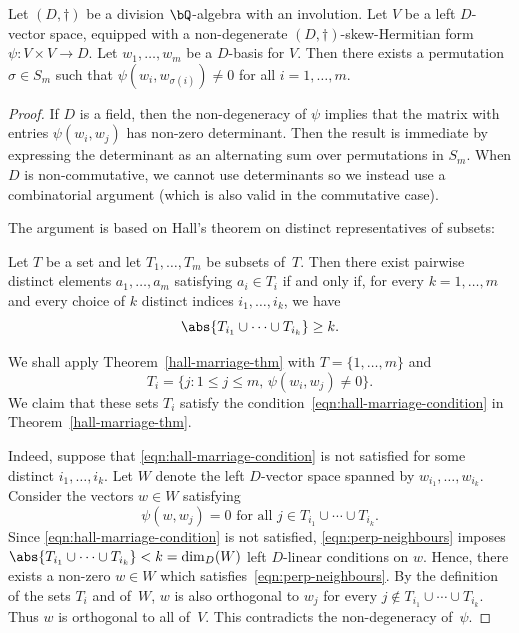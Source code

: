 \begin{lemma} \label{non-zero-permutation}
Let $(D,\dag)$ be a division $\bQ$-algebra with an involution.
Let $V$ be a left $D$\nobreakdash-vector space, equipped with a non-degenerate $(D,\dag)$-skew-Hermitian form \hbox{$\psi \colon V \times V \to D$}.
Let $w_1, \dotsc, w_m$ be a $D$-basis for $V$.
Then there exists a permutation $\sigma \in S_m$ such that
$\psi(w_i, w_{\sigma(i)}) \neq 0$
for all $i = 1, \dotsc, m$.
\end{lemma}

\begin{proof}
If $D$ is a field, then the non-degeneracy of $\psi$ implies that the matrix with entries $\psi(w_i,w_j)$ has non-zero determinant.
Then the result is immediate by expressing the determinant as an alternating sum over permutations in $S_m$.
When $D$ is non-commutative, we cannot use determinants so we instead use a combinatorial argument (which is also valid in the commutative case).

The argument is based on Hall's theorem on distinct representatives of subsets:
\begin{theorem} \label{hall-marriage-thm}
Let $T$ be a set and let $T_1, \dotsc, T_m$ be subsets of~$T$.
Then there exist pairwise distinct elements $a_1, \dotsc, a_m$ satisfying $a_i \in T_i$ if and only if, for every $k = 1, \dotsc, m$ and every choice of $k$ distinct indices $i_1, \dotsc, i_k$, we have
\begin{equation} \label{eqn:hall-marriage-condition}
\abs{T_{i_1} \cup \dotsb \cup T_{i_k}} \geq k.
\end{equation}
\end{theorem}

We shall apply Theorem~\ref{hall-marriage-thm} with $T = \{ 1, \dotsc, m \}$ and
\[
T_i = \{ j : 1 \leq j \leq m, \, \psi(w_i, w_j) \neq 0 \}.
\]
We claim that these sets $T_i$ satisfy the condition~\eqref{eqn:hall-marriage-condition} in Theorem~\ref{hall-marriage-thm}.

Indeed, suppose that \eqref{eqn:hall-marriage-condition} is not satisfied for some distinct $i_1, \dotsc, i_k$.
Let $W$ denote the left $D$-vector space spanned by $w_{i_1}, \dotsc, w_{i_k}$.
Consider the vectors $w \in W$ satisfying
\begin{equation} \label{eqn:perp-neighbours}
\psi(w, w_j) = 0 \text{ for all } j \in T_{i_1} \cup \dotsb \cup T_{i_k}.
\end{equation}
Since \eqref{eqn:hall-marriage-condition} is not satisfied, \eqref{eqn:perp-neighbours} imposes $\abs{T_{i_1} \cup \dotsb \cup T_{i_k}} < k = \dim_D(W)$ left $D$-linear conditions on $w$.
Hence, there exists a non-zero $w \in W$ which satisfies~\eqref{eqn:perp-neighbours}.
By the definition of the sets $T_i$ and of~$W$, $w$ is also orthogonal to $w_j$ for every $j \not\in T_{i_1} \cup \dotsb \cup T_{i_k}$.
Thus $w$ is orthogonal to all of~$V$. This contradicts the non-degeneracy of~$\psi$.


\end{proof}
